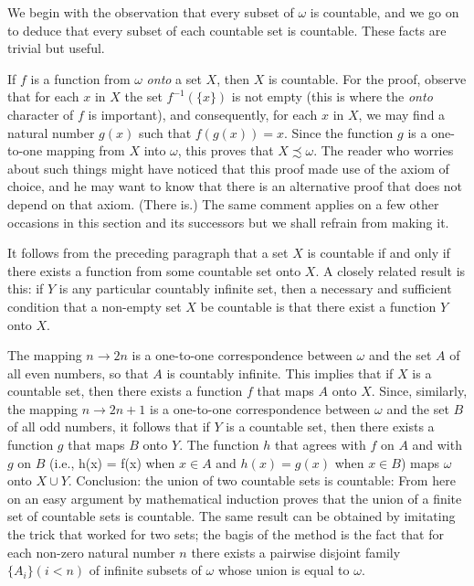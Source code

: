 We begin with the observation that every subset of $\omega$ is countable, and we go on to deduce that every subset of each countable set is countable. These facts are trivial but useful.

If $f$ is a function from $\omega$ \textit{onto} a set $X$, then $X$ is countable. For the proof, observe that for each $x$ in $X$ the set $f^{-1}(\{ x \})$ is not empty (this is where the \textit{onto} character of $f$ is important), and consequently, for each $x$ in $X$, we may find a natural number $g(x)$ such that $f(g(x)) = x$. Since the function $g$ is a one-to-one mapping from $X$ into $\omega$, this proves that $X \precsim \omega$. The reader who worries about such things might have noticed that this proof made use of the axiom of choice, and he may want to know that there is an alternative proof that does not depend on that axiom. (There is.) The same comment applies on a few other occasions in this section and its successors but we shall refrain from making it.

It follows from the preceding paragraph that a set $X$ is countable if and only if there exists a function from some countable set onto $X$. A closely related result is this: if $Y$ is any particular countably infinite set, then a necessary and sufficient condition that a non-empty set $X$ be countable is that there exist a function $Y$ onto $X$.

The mapping $n \rightarrow 2n$ is a one-to-one correspondence between $\omega$ and the set $A$ of all even numbers, so that $A$ is countably infinite. This implies that if $X$ is a countable set, then there exists a function $f$ that maps $A$ onto $X$. Since, similarly, the mapping $n \rightarrow 2n + 1$ is a one-to-one correspondence between $\omega$ and the set $B$ of all odd numbers, it follows that if $Y$ is a countable set, then there exists a function $g$ that maps $B$ onto $Y$. The function $h$ that agrees with $f$ on $A$ and with $g$ on $B$ (i.e., h(x) = f(x) when $x \in A$ and $h(x) = g(x)$ when $x \in B$) maps $\omega$ onto $X \cup Y$. Conclusion: the union of two countable sets is countable: From here on an easy argument by mathematical induction proves that the union of a finite set of countable sets is countable. The same result can be obtained by imitating the trick that worked for two sets; the bagis of the method is the fact that for each non-zero natural number $n$ there exists a pairwise disjoint family $\{ A_{i} \} (i < n)$ of infinite subsets of $\omega$ whose union is equal to $\omega$.

